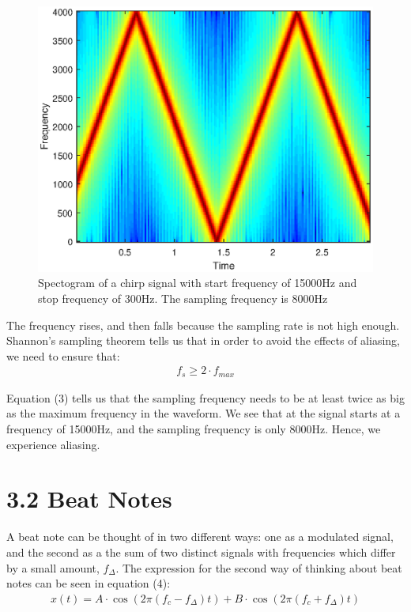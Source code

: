 \documentclass{article}
\begin{document}
\begin{figure}[H]
	\centering
	\includegraphics[scale=0.8]{fig3}
	\caption{Spectogram of a chirp signal with start frequency of 15000$\si{\hertz}$ and stop frequency of 300$\si{\hertz}$. The sampling frequency is 8000$\si{\hertz}$}
\end{figure}

The frequency rises, and then falls because the sampling rate is not high enough. Shannon's sampling theorem tells us that in order to avoid the effects of aliasing, we need to ensure that:
\begin{align}
	f_s \geq 2 \cdot f_{max}
\end{align}

Equation (3) tells us that the sampling frequency needs to be at least twice as big as the maximum frequency in the waveform. We see that at the signal starts at a frequency of 15000$\si{\hertz}$, and the sampling frequency is only 8000$\si{\hertz}$. Hence, we experience aliasing.

\section{3.2 Beat Notes}
A beat note can be thought of in two different ways: one as a modulated signal, and the second as a the sum of two distinct signals with frequencies which differ by a small amount, $f_{\Delta}$. The expression for the second way of thinking about beat notes can be seen in equation (4):
\begin{align}
	x(t) = A \cdot \cos(2 \pi (f_c - f_{\Delta})t) + B \cdot \cos(2 \pi (f_c + f_{\Delta})t)
\end{align}
\end{document}
